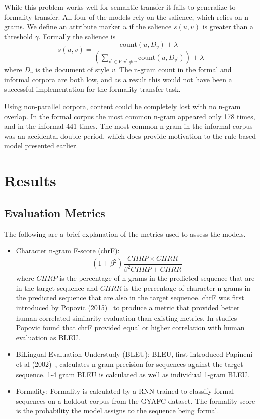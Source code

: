 \documentclass[12pt]{article}
\begin{document}
While this problem works well for semantic transfer it fails to generalize 
to formality transfer. All four of the models rely on the salience, which relies 
on n-grams. 
We define an attribute marker $u$ if the salience $s(u,v)$ is 
greater than a threshold $\gamma$. Formally the salience is 
$$ s(u,v) = \frac{\text{count}(u, D_v) + \lambda}{(\sum_{v^\prime \in V, v^\prime \neq v} \text{count}(u, D_{v^\prime })) + \lambda} $$
where $D_v$ is the document of style $v$. The n-gram count in the formal and informal corpora
are both low, and as a result this would not have been a successful implementation for the 
formality transfer task. \par
Using non-parallel corpora, content could be completely lost with no n-gram overlap. In the
formal corpus the most common n-gram appeared only 178 times, and in the informal 441 times.
The most common n-gram in the informal corpus was an accidental double period, which does
provide motivation to the rule based model presented earlier.


\section{Results}
\subsection{Evaluation Metrics}
The following are a brief explanation of the metrics used to assess the models. 
\begin{itemize}
    \item Character n-gram F-score (chrF): 
    $$ (1 + \beta^2) \frac{CHRP \times CHRR}{\beta^2 CHRP + CHRR} $$
    where $CHRP$ is the percentage of n-grams in the predicted sequence that are 
    in the target sequence and $CHRR$ is the percentage of character n-grams in 
    the predicted sequence that are also in the target sequence.  chrF was first 
    introduced by Popovic (2015)~\cite{chrf} to produce a metric that provided 
    better human correlated similarity evaluation than existing metrics. In studies
    Popovic found that chrF provided equal or higher correlation with human evaluation
    as BLEU. 
    \item BiLingual Evaluation Understudy (BLEU): BLEU, first introduced Papineni et al 
    (2002)~\cite{papineni-etal-2002-bleu}, calculates n-gram precision 
    for sequences against the target sequence. 1-4 gram BLEU is calculated as well
    as individual 1-gram BLEU.
    \item  Formality: Formality is calculated by a RNN trained to classify formal 
    sequences on a holdout corpus from the GYAFC dataset. The formality score is 
    the probability the model assigns to the sequence being formal. 
\end{itemize}
\end{document}
